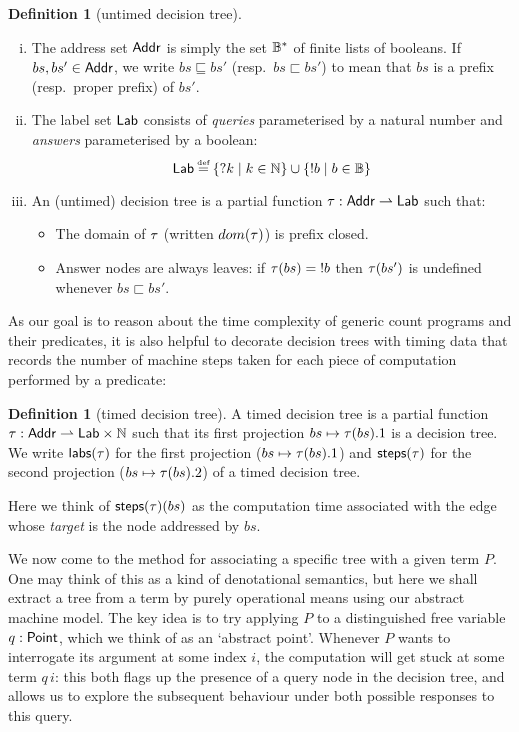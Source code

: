 \documentclass[12pt,phd,lfcs,twoside,openright,logo,leftchapter,normalheadings]{infthesis}
\theoremstyle{plain}
\theoremstyle{definition}
\newtheorem{definition}[theorem]{Definition}
\begin{document}
\begin{definition}[untimed decision tree]\label{def:decision-tree}
  ~
  \begin{enumerate}[(i)]
  \item The address set $\mathsf{Addr}$ is simply the set $\mathbb{B}^\ast$ of finite
    lists of booleans.  If $bs,bs' \in \mathsf{Addr}$, we write
    $bs \sqsubseteq bs'$ (resp.\ $bs \sqsubset bs'$) to mean that $bs$
    is a prefix (resp.\ proper prefix) of $bs'$.

  \item The label set $\mathsf{Lab}$ consists of \emph{queries} parameterised
    by a natural number and \emph{answers} parameterised by a boolean:
 {
  \[
  \Lab \defas \{\query k \mid k \in \N \} \cup \{\ans b \mid b \in \B \}
  \]
}%

\item An (untimed) decision tree is a partial function
  $\tau : \mathsf{Addr} \rightharpoonup \mathsf{Lab}$ such that:
\begin{itemize}
  \item The domain of $\tau$ (written $dom(\tau)$) is prefix closed.
  \item Answer nodes are always leaves:
    if $\tau(bs) = \mathord{!} b$ then $\tau(bs')$ is undefined whenever $bs \sqsubset bs'$.
  \end{itemize}
\end{enumerate}
\end{definition}

As our goal is to reason about the time complexity of generic count
programs and their predicates, it is also helpful to decorate decision
trees with timing data that records the number of machine steps taken
for each piece of computation performed by a predicate:

\begin{definition}[timed decision tree]\label{def:timed-decision-tree}
A timed decision tree is a partial function $\tau : \mathsf{Addr} \rightharpoonup
\mathsf{Lab} \times \mathbb{N}$ such that its first projection $bs \mapsto \tau(bs).1$
is a decision tree.
%
We write $\mathsf{labs}(\tau)$ for the first projection ($bs \mapsto \tau(bs).1$) and
$\mathsf{steps}(\tau)$ for the second projection ($bs \mapsto \tau(bs).2$) of a timed
decision tree.
\end{definition}

Here we think of $\mathsf{steps}(\tau)(bs)$ as the computation time
associated with the edge whose \emph{target} is the node addressed by
$bs$.

We now come to the method for associating a specific tree with a given
term $P$. One may think of this as a kind of denotational semantics,
but here we shall extract a tree from a term by purely operational
means using our abstract machine model. The key idea is to try
applying $P$ to a distinguished free variable $q: \mathsf{Point}$, which we
think of as an `abstract point'. Whenever $P$ wants to interrogate its
argument at some index $i$, the computation will get stuck at some
term $q\,i$: this both flags up the presence of a query node in the
decision tree, and allows us to explore the subsequent behaviour under
both possible responses to this query.
\end{document}
